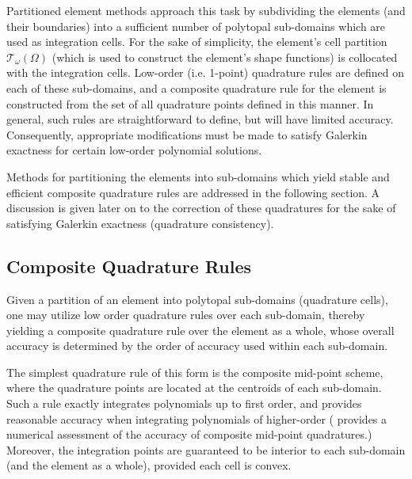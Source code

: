 Partitioned element methods approach this task by subdividing the elements (and their boundaries) into a sufficient number of polytopal sub-domains which are used as integration cells. For the sake of simplicity, the element's cell partition $\mathcal{T}_\omega (\Omega)$ (which is used to construct the element's shape functions) is collocated with the integration cells. Low-order (i.e. 1-point) quadrature rules are defined on each of these sub-domains, and a composite quadrature rule for the element is constructed from the set of all quadrature points defined in this manner. In general, such rules are straightforward to define, but will have limited accuracy. Consequently, appropriate modifications must be made to satisfy Galerkin exactness for certain low-order polynomial solutions.
	
Methods for partitioning the elements into sub-domains which yield stable and efficient composite quadrature rules are addressed in the following section. A discussion is given later on to the correction of these quadratures for the sake of satisfying Galerkin exactness (quadrature consistency).
		
	\subsection*{Composite Quadrature Rules}
	
	Given a partition of an element into polytopal sub-domains (quadrature cells), one may utilize low order quadrature rules over each sub-domain, thereby yielding a composite quadrature rule over the element as a whole, whose overall accuracy is determined by the order of accuracy used within each sub-domain.
	
	The simplest quadrature rule of this form is the composite mid-point scheme, where the quadrature points are located at the centroids of each sub-domain. Such a rule exactly integrates polynomials up to first order, and provides reasonable accuracy when integrating polynomials of higher-order (\cite{Rashid:12} provides a numerical assessment of the accuracy of composite mid-point quadratures.) Moreover, the integration points are guaranteed to be interior to each sub-domain (and the element as a whole), provided each cell is convex.
	
